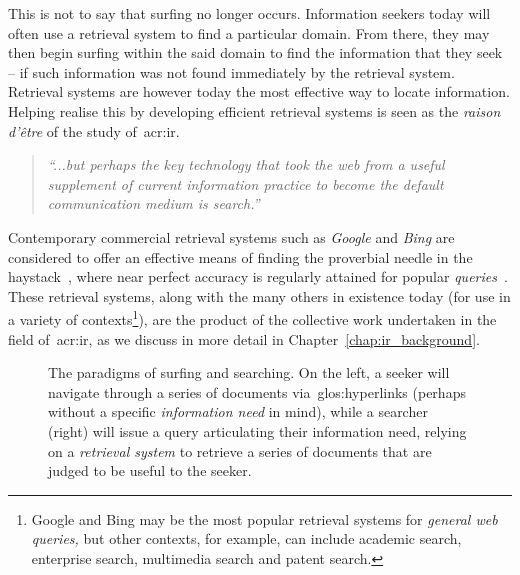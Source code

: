 This is not to say that surfing no longer occurs. Information seekers today will often use a retrieval system to find a particular domain. From there, they may then begin surfing within the said domain to find the information that they seek -- if such information was not found immediately by the retrieval system. Retrieval systems are however today the most effective way to locate information. Helping  realise this by developing efficient retrieval systems is seen as the \emph{raison d'\^{e}tre} of the study of~\gls{acr:ir}.

\begin{quote}
    \emph{``...but perhaps the key technology that took the web from a useful supplement of current information practice to become the default communication medium is search.''}
\end{quote}

Contemporary commercial retrieval systems such as \emph{Google} and \emph{Bing} are considered to offer an effective means of finding the proverbial needle in the haystack~\citep{wilson2010keyword_search}, where near perfect accuracy is regularly attained for popular \emph{queries}~\citep{vaughan2004new_measurements}. These retrieval systems, along with the many others in existence today (for use in a variety of contexts\footnote{Google and Bing may be the most popular retrieval systems for \emph{general web queries,} but other contexts, for example, can include academic search, enterprise search, multimedia search and patent search.}), are the product of the collective work undertaken in the field of~\gls{acr:ir}, as we discuss in more detail in Chapter~\ref{chap:ir_background}.

\begin{figure}[t!]
    \centering
    \caption[Surfing vs. searching: illustrations of the two paradigms]{The paradigms of surfing and searching. On the left, a seeker will navigate through a series of documents via~\glspl{glos:hyperlink} (perhaps without a specific \emph{information need} in mind), while a searcher (right) will issue a query articulating their information need, relying on a \emph{retrieval system} to retrieve a series of documents that are judged to be useful to the seeker.}
    \label{fig:ch1-surfing}
\end{figure}

